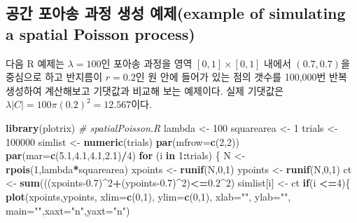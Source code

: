 \documentclass[b5paper,]{scrbook}
\makeatletter
\newenvironment{Shaded}{\begin{snugshade}}{\end{snugshade}}
\newcommand{\CommentTok}[1]{\textcolor[rgb]{0.56,0.35,0.01}{\textit{#1}}}
\newcommand{\ControlFlowTok}[1]{\textcolor[rgb]{0.13,0.29,0.53}{\textbf{#1}}}
\newcommand{\DataTypeTok}[1]{\textcolor[rgb]{0.13,0.29,0.53}{#1}}
\newcommand{\DecValTok}[1]{\textcolor[rgb]{0.00,0.00,0.81}{#1}}
\newcommand{\FloatTok}[1]{\textcolor[rgb]{0.00,0.00,0.81}{#1}}
\newcommand{\KeywordTok}[1]{\textcolor[rgb]{0.13,0.29,0.53}{\textbf{#1}}}
\newcommand{\NormalTok}[1]{#1}
\newcommand{\OperatorTok}[1]{\textcolor[rgb]{0.81,0.36,0.00}{\textbf{#1}}}
\newcommand{\StringTok}[1]{\textcolor[rgb]{0.31,0.60,0.02}{#1}}
\theoremstyle{plain}
\theoremstyle{definition}
\numberwithin{equation}{section}
\newenvironment{kframe}{%
\medskip{}
\setlength{\fboxsep}{.8em}
 \def\at@end@of@kframe{}%
 \ifinner\ifhmode%
  \def\at@end@of@kframe{\end{minipage}}%
  \begin{minipage}{\columnwidth}%
 \fi\fi%
 \def\FrameCommand##1{\hskip\@totalleftmargin \hskip-\fboxsep
 \colorbox{shadecolor}{##1}\hskip-\fboxsep
     \hskip-\linewidth \hskip-\@totalleftmargin \hskip\columnwidth}%
 \MakeFramed {\advance\hsize-\width
   \@totalleftmargin\z@ \linewidth\hsize
   \@setminipage}}%
 {\par\unskip\endMakeFramed%
 \at@end@of@kframe}
\renewenvironment{Shaded}{\begin{kframe}}{\end{kframe}}
\makeatother
\begin{document}
\hypertarget{----example-of-simulating-a-spatial-poisson-process}{%
\subsection{공간 포아송 과정 생성 예제(example of simulating a spatial Poisson process)}\label{----example-of-simulating-a-spatial-poisson-process}}

다음 R 예제는 \(\lambda=100\)인 포아송 과정을 영역 \([0,1]\times [0,1]\) 내에서 \((0.7,0.7)\)을 중심으로 하고 반지름이 \(r=0.2\)인 원 안에 들어가 있는 점의 갯수를 100,000번 반복 생성하여 계산해보고 기댓값과 비교해 보는 예제이다. 실제 기댓값은 \(\lambda |C|=100\pi (0.2)^{2}=12.567\)이다.

\begin{Shaded}
\begin{Highlighting}[]
\KeywordTok{library}\NormalTok{(plotrix)}
\CommentTok{# spatialPoisson.R}
\NormalTok{lambda <-}\StringTok{ }\DecValTok{100}
\NormalTok{squarearea <-}\StringTok{ }\DecValTok{1}
\NormalTok{trials <-}\StringTok{ }\DecValTok{100000}
\NormalTok{simlist <-}\StringTok{ }\KeywordTok{numeric}\NormalTok{(trials)}
\KeywordTok{par}\NormalTok{(}\DataTypeTok{mfrow=}\KeywordTok{c}\NormalTok{(}\DecValTok{2}\NormalTok{,}\DecValTok{2}\NormalTok{))}
\KeywordTok{par}\NormalTok{(}\DataTypeTok{mar=}\KeywordTok{c}\NormalTok{(}\FloatTok{5.1}\NormalTok{,}\FloatTok{4.1}\NormalTok{,}\FloatTok{4.1}\NormalTok{,}\FloatTok{2.1}\NormalTok{)}\OperatorTok{/}\DecValTok{4}\NormalTok{)}
\ControlFlowTok{for}\NormalTok{ (i }\ControlFlowTok{in} \DecValTok{1}\OperatorTok{:}\NormalTok{trials) \{}
\NormalTok{  N <-}\StringTok{ }\KeywordTok{rpois}\NormalTok{(}\DecValTok{1}\NormalTok{,lambda}\OperatorTok{*}\NormalTok{squarearea)}
\NormalTok{  xpoints <-}\StringTok{ }\KeywordTok{runif}\NormalTok{(N,}\DecValTok{0}\NormalTok{,}\DecValTok{1}\NormalTok{)}
\NormalTok{  ypoints <-}\StringTok{ }\KeywordTok{runif}\NormalTok{(N,}\DecValTok{0}\NormalTok{,}\DecValTok{1}\NormalTok{)}
\NormalTok{  ct <-}\StringTok{ }\KeywordTok{sum}\NormalTok{(((xpoints}\FloatTok{-0.7}\NormalTok{)}\OperatorTok{^}\DecValTok{2}\OperatorTok{+}\NormalTok{(ypoints}\FloatTok{-0.7}\NormalTok{)}\OperatorTok{^}\DecValTok{2}\NormalTok{)}\OperatorTok{<=}\FloatTok{0.2}\OperatorTok{^}\DecValTok{2}\NormalTok{)}
\NormalTok{  simlist[i] <-}\StringTok{ }\NormalTok{ct }
  \ControlFlowTok{if}\NormalTok{(i }\OperatorTok{<=}\DecValTok{4}\NormalTok{)\{}
    \KeywordTok{plot}\NormalTok{(xpoints,ypoints, }\DataTypeTok{xlim=}\KeywordTok{c}\NormalTok{(}\DecValTok{0}\NormalTok{,}\DecValTok{1}\NormalTok{), }\DataTypeTok{ylim=}\KeywordTok{c}\NormalTok{(}\DecValTok{0}\NormalTok{,}\DecValTok{1}\NormalTok{), }\DataTypeTok{xlab=}\StringTok{""}\NormalTok{, }\DataTypeTok{ylab=}\StringTok{""}\NormalTok{, }\DataTypeTok{main=}\StringTok{""}\NormalTok{,}\DataTypeTok{xaxt=}\StringTok{"n"}\NormalTok{,}\DataTypeTok{yaxt=}\StringTok{"n"}\NormalTok{)}

\end{Highlighting}
\end{Shaded}
\end{document}

